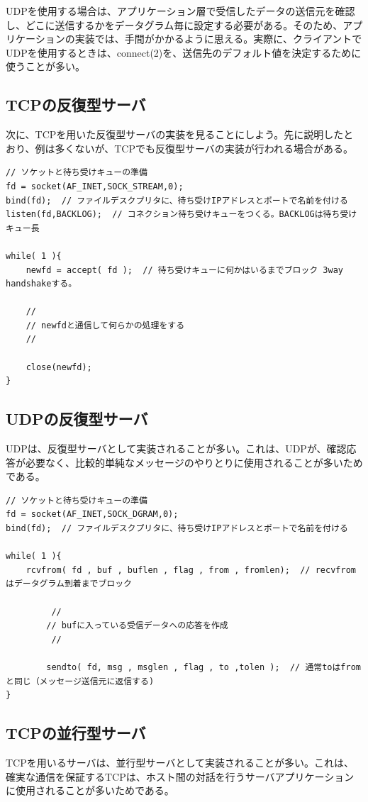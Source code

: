 UDPを使用する場合は、アプリケーション層で受信したデータの送信元を確認し、どこに送信するかをデータグラム毎に設定する必要がある。そのため、アプリケーションの実装では、手間がかかるように思える。実際に、クライアントでUDPを使用するときは、connect(2)を、送信先のデフォルト値を決定するために使うことが多い。


\subsection{TCPの反復型サーバ}
次に、TCPを用いた反復型サーバの実装を見ることにしよう。先に説明したとおり、例は多くないが、TCPでも反復型サーバの実装が行われる場合がある。

{\scriptsize
\begin{verbatim}
// ソケットと待ち受けキューの準備
fd = socket(AF_INET,SOCK_STREAM,0);
bind(fd);  // ファイルデスクプリタに、待ち受けIPアドレスとポートで名前を付ける
listen(fd,BACKLOG);  // コネクション待ち受けキューをつくる。BACKLOGは待ち受けキュー長

while( 1 ){
    newfd = accept( fd );  // 待ち受けキューに何かはいるまでブロック 3way handshakeする。

    //
    // newfdと通信して何らかの処理をする
    //

    close(newfd);
}
\end{verbatim}
}

\subsection{UDPの反復型サーバ}
UDPは、反復型サーバとして実装されることが多い。これは、UDPが、確認応答が必要なく、比較的単純なメッセージのやりとりに使用されることが多いためである。

{\scriptsize
\begin{verbatim}
// ソケットと待ち受けキューの準備
fd = socket(AF_INET,SOCK_DGRAM,0);
bind(fd);  // ファイルデスクプリタに、待ち受けIPアドレスとポートで名前を付ける

while( 1 ){
    rcvfrom( fd , buf , buflen , flag , from , fromlen);  // recvfromはデータグラム到着までブロック
 
         //
        // bufに入っている受信データへの応答を作成
         //
 
        sendto( fd, msg , msglen , flag , to ,tolen );  // 通常toはfromと同じ（メッセージ送信元に返信する)
}
\end{verbatim}
}

\subsection{TCPの並行型サーバ}
TCPを用いるサーバは、並行型サーバとして実装されることが多い。これは、確実な通信を保証するTCPは、ホスト間の対話を行うサーバアプリケーションに使用されることが多いためである。

